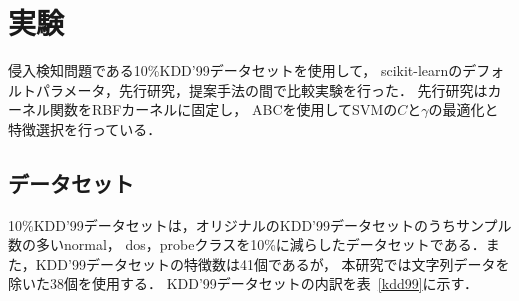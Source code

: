 \section{実験}
侵入検知問題である10\%KDD'99データセットを使用して，
scikit-learnのデフォルトパラメータ，先行研究，提案手法の間で比較実験を行った．
先行研究はカーネル関数をRBFカーネルに固定し，
ABCを使用してSVMの$C$と$\gamma$の最適化と特徴選択を行っている\cite{origin}．
\subsection{データセット}
10\%KDD'99データセットは，オリジナルのKDD'99データセットのうちサンプル数の多いnormal，
dos，probeクラスを10\%に減らしたデータセットである．また，KDD'99データセットの特徴数は41個であるが，
本研究では文字列データを除いた38個を使用する．
KDD'99データセットの内訳を表~\ref{kdd99}に示す．
